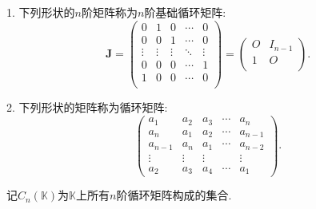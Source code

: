 \documentclass[../../main.tex]{subfiles}%
\begin{document}
\begin{definition}[循环矩阵]\label{definition:循环矩阵}
1. 下列形状的$n$阶矩阵称为\(n\)阶基础循环矩阵:
\[ 
\boldsymbol{J}=
\left( \begin{matrix}
0&		1&		0&		\cdots&		0\\
0&		0&		1&		\cdots&		0\\
\vdots&		\vdots&		\vdots&	\ddots&		\vdots\\
0&		0&		0&		\cdots&		1\\
1&		0&		0&		\cdots&		0\\
\end{matrix} \right)=\left( \begin{matrix}
	O&		I_{n-1}\\
	1&		O\\
\end{matrix} \right) .
\]

2. 下列形状的矩阵称为循环矩阵:
\[
\begin{pmatrix}
a_1 & a_2 & a_3 & \cdots & a_n \\
a_n & a_1 & a_2 & \cdots & a_{n - 1} \\
a_{n - 1} & a_n & a_1 & \cdots & a_{n - 2} \\
\vdots & \vdots & \vdots & & \vdots \\
a_2 & a_3 & a_4 & \cdots & a_1
\end{pmatrix}.
\]
\end{definition}
\begin{note}
记\(C_n(\mathbb{K})\)为\(\mathbb{K}\)上所有\(n\)阶循环矩阵构成的集合.
\end{note}
\end{document}

